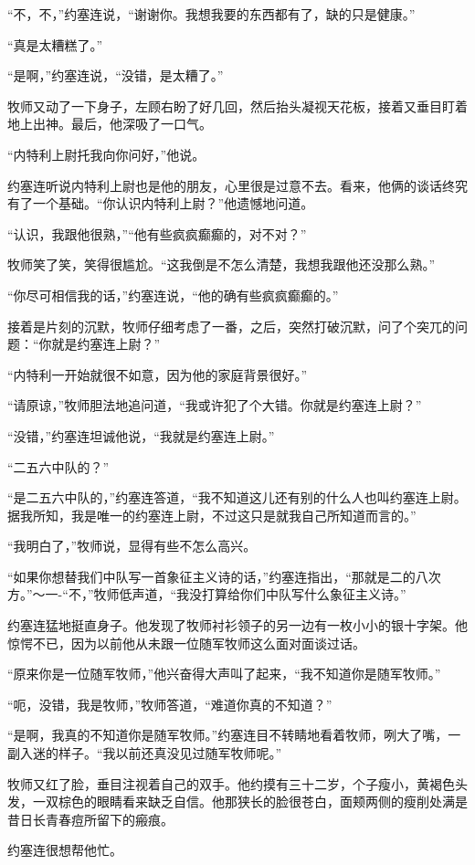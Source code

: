 “不，不，”约塞连说，“谢谢你。我想我要的东西都有了，缺的只是健康。”

“真是太糟糕了。”

“是啊，”约塞连说，“没错，是太糟了。”

牧师又动了一下身子，左顾右盼了好几回，然后抬头凝视天花板，接着又垂目盯着地上出神。最后，他深吸了一口气。

“内特利上尉托我向你问好，”他说。

约塞连听说内特利上尉也是他的朋友，心里很是过意不去。看来，他俩的谈话终究有了一个基础。“你认识内特利上尉？”他遗憾地问道。

“认识，我跟他很熟，”“他有些疯疯癫癫的，对不对？”

牧师笑了笑，笑得很尴尬。“这我倒是不怎么清楚，我想我跟他还没那么熟。”

“你尽可相信我的话，”约塞连说，“他的确有些疯疯癫癫的。”

接着是片刻的沉默，牧师仔细考虑了一番，之后，突然打破沉默，问了个突兀的问题：“你就是约塞连上尉？”

“内特利一开始就很不如意，因为他的家庭背景很好。”

“请原谅，”牧师胆法地追问道，“我或许犯了个大错。你就是约塞连上尉？”

“没错，”约塞连坦诚他说，“我就是约塞连上尉。”

“二五六中队的？”

“是二五六中队的，”约塞连答道，“我不知道这儿还有别的什么人也叫约塞连上尉。据我所知，我是唯一的约塞连上尉，不过这只是就我自己所知道而言的。”

“我明白了，”牧师说，显得有些不怎么高兴。

“如果你想替我们中队写一首象征主义诗的话，”约塞连指出，“那就是二的八次方。”～一-“不，”牧师低声道，“我没打算给你们中队写什么象征主义诗。”

约塞连猛地挺直身子。他发现了牧师衬衫领子的另一边有一枚小小的银十字架。他惊愕不已，因为以前他从未跟一位随军牧师这么面对面谈过话。

“原来你是一位随军牧师，”他兴奋得大声叫了起来，“我不知道你是随军牧师。”

“呃，没错，我是牧师，”牧师答道，“难道你真的不知道？”

“是啊，我真的不知道你是随军牧师。”约塞连目不转睛地看着牧师，咧大了嘴，一副入迷的样子。“我以前还真没见过随军牧师呢。”

牧师又红了脸，垂目注视着自己的双手。他约摸有三十二岁，个子瘦小，黄褐色头发，一双棕色的眼睛看来缺乏自信。他那狭长的脸很苍白，面颊两侧的瘦削处满是昔日长青春痘所留下的瘢痕。

约塞连很想帮他忙。


